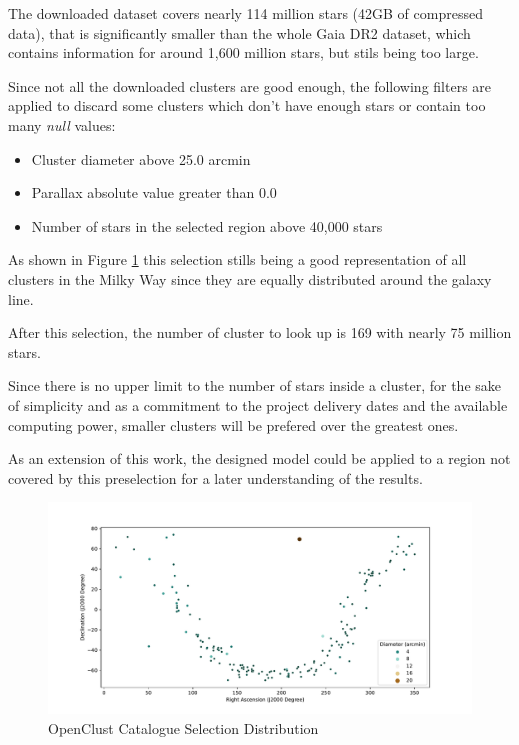 \documentclass[11pt, a4paper, english]{book}
\begin{document}
The downloaded dataset covers nearly 114 million stars (42GB of compressed data), that is significantly smaller than the whole Gaia DR2 dataset, which contains
information for around 1,600 million stars, but stils being too large.

Since not all the downloaded clusters are good enough, the following filters are applied to discard some clusters which don't have enough stars or contain too
many \emph{null} values:

\begin{itemize}
  \item Cluster diameter above 25.0 arcmin
  \item Parallax absolute value greater than 0.0
  \item Number of stars in the selected region above 40,000 stars
\end{itemize}

As shown in Figure \ref{fig:OpenClustSelection} this selection stills being a good representation of all clusters in the Milky Way since they are
equally distributed around the galaxy line.

After this selection, the number of cluster to look up is 169 with nearly 75 million stars.

Since there is no upper limit to the number of stars inside a cluster, for the sake of simplicity and as a commitment to the project delivery dates
and the available computing power, smaller clusters will be prefered over the greatest ones.

As an extension of this work, the designed model could be applied to a region not covered by this preselection for a later understanding of the results.

\begin{figure}[htbp]
  \centering
  \includegraphics[width=\columnwidth]{../figures/cluster_selection_tier1.pdf}
  \caption{OpenClust Catalogue Selection Distribution}
  \label{fig:OpenClustSelection}
\end{figure}
\end{document}
